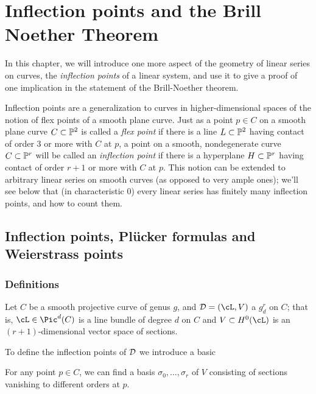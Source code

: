 

\chapter{Inflection points and the Brill Noether Theorem}
\label{InflectionsChapter}


In this chapter, we will introduce one more aspect of the geometry of linear series on curves, the \emph{inflection points} of a linear system, and use it to give a proof of one implication in the statement of the Brill-Noether theorem.

Inflection points are a generalization to curves in higher-dimensional spaces of the notion of flex points of a smooth plane curve. Just as a point $p \in C$ on a smooth plane curve $C \subset \PP^2$ is called a \emph{flex point} if there is a line $L \subset \PP^2$ having contact of order 3 or more with $C$ at $p$, a point on a smooth, nondegenerate curve $C \subset \PP^r$ will be called an \emph{inflection point} if there is a hyperplane $H \subset \PP^r$ having contact of order $r+1$ or more with $C$ at $p$. This notion can be extended to arbitrary linear series on smooth curves (as opposed to very ample ones); we'll see below that (in characteristic 0) every linear series has finitely many inflection points, and how to count them.


\section{Inflection points,  Pl\"ucker formulas and Weierstrass points}

\subsection{Definitions}

Let $C$ be a smooth projective curve of genus $g$, and $\cD = (\cL,V)$ a $g^r_d$ on $C$; that is, $\cL \in \Pic^d(C)$ is a line bundle of degree $d$ on $C$ and $V \subset H^0(\cL)$ is an $(r+1)$-dimensional vector space of sections.   

To define the inflection points of $\cD$ we introduce a basic

\begin{proposition} For any point $p \in C$, we can find a basis $\sigma_0, \dots, \sigma_r$ of $V$ consisting of sections vanishing to different orders at $p$.
\end{proposition}

